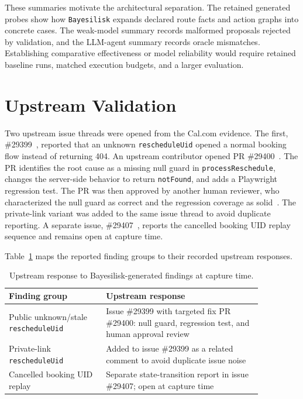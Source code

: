 \documentclass[10pt]{article}
\newcommand{\tool}{\texttt{Bayesilisk}\xspace}
\begin{document}
These summaries motivate the architectural separation. The retained generated
probes show how \tool expands declared route facts and action graphs into
concrete cases. The weak-model summary records malformed proposals rejected by
validation, and the LLM-agent summary records oracle mismatches. Establishing
comparative effectiveness or model reliability would require retained baseline
runs, matched execution budgets, and a larger evaluation.

\section{Upstream Validation}

Two upstream issue threads were opened from the Cal.com evidence. The first,
\#29399~\cite{calcomIssue}, reported that an unknown \texttt{rescheduleUid}
opened a normal booking flow instead of returning 404. An upstream contributor
opened PR \#29400~\cite{calcomFixPr}. The PR identifies the root cause as a
missing null guard in \texttt{processReschedule}, changes the server-side
behavior to return \texttt{notFound}, and adds a Playwright regression test. The
PR was then approved by another human reviewer, who characterized the null
guard as correct and the regression coverage as solid~\cite{calcomFixReview}. The
private-link variant was added to the same issue thread to avoid duplicate
reporting. A separate issue, \#29407~\cite{calcomCancelledIssue}, reports the
cancelled booking UID replay sequence and remains open at capture time.

Table~\ref{tab:calcom-upstream} maps the reported finding groups to their
recorded upstream responses.

\begin{table}[H]
\centering
\caption{Upstream response to Bayesilisk-generated findings at capture time.}
\label{tab:calcom-upstream}
\small
\setlength{\tabcolsep}{3pt}
\begin{tabular}{p{0.33\linewidth}p{0.53\linewidth}}
\toprule
Finding group & Upstream response \\
\midrule
Public unknown/stale \texttt{rescheduleUid} & Issue \#29399 with targeted fix PR \#29400: null guard, regression test, and human approval review \\
Private-link \texttt{rescheduleUid} & Added to issue \#29399 as a related comment to avoid duplicate issue noise \\
Cancelled booking UID replay & Separate state-transition report in issue \#29407; open at capture time \\
\bottomrule
\end{tabular}
\end{table}
\end{document}
